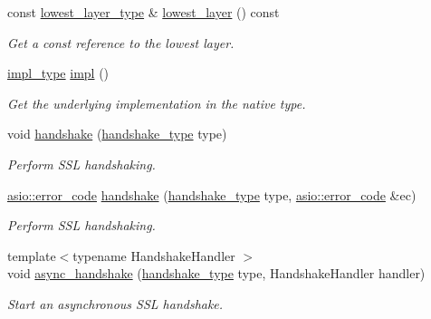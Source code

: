 \begin{DoxyCompactItemize}
const \hyperlink{classasio_1_1ssl_1_1old_1_1stream_a6b664149066b698269db4e2f4e846ca2}{lowest\+\_\+layer\+\_\+type} \& \hyperlink{classasio_1_1ssl_1_1old_1_1stream_ab029c9d927db0140d70c6730226aad03}{lowest\+\_\+layer} () const 
\begin{DoxyCompactList}\small\item\em Get a const reference to the lowest layer. \end{DoxyCompactList}\item 
\hyperlink{classasio_1_1ssl_1_1old_1_1stream_a965fd8deeebbf308d18fbac925009d8d}{impl\+\_\+type} \hyperlink{classasio_1_1ssl_1_1old_1_1stream_ac8d24d7329411233167125d82b6d38bf}{impl} ()
\begin{DoxyCompactList}\small\item\em Get the underlying implementation in the native type. \end{DoxyCompactList}\item 
void \hyperlink{classasio_1_1ssl_1_1old_1_1stream_a326a75224a55b43ac12d2676d465958c}{handshake} (\hyperlink{classasio_1_1ssl_1_1stream__base_a2f18813d3860bc8aee99249834d7c320}{handshake\+\_\+type} type)
\begin{DoxyCompactList}\small\item\em Perform S\+S\+L handshaking. \end{DoxyCompactList}\item 
\hyperlink{classasio_1_1error__code}{asio\+::error\+\_\+code} \hyperlink{classasio_1_1ssl_1_1old_1_1stream_ad4d612fa88c243e25dad7e1db1428973}{handshake} (\hyperlink{classasio_1_1ssl_1_1stream__base_a2f18813d3860bc8aee99249834d7c320}{handshake\+\_\+type} type, \hyperlink{classasio_1_1error__code}{asio\+::error\+\_\+code} \&ec)
\begin{DoxyCompactList}\small\item\em Perform S\+S\+L handshaking. \end{DoxyCompactList}\item 
{\footnotesize template$<$typename Handshake\+Handler $>$ }\\void \hyperlink{classasio_1_1ssl_1_1old_1_1stream_a0d27ecfa0483d789afcf60638db66d76}{async\+\_\+handshake} (\hyperlink{classasio_1_1ssl_1_1stream__base_a2f18813d3860bc8aee99249834d7c320}{handshake\+\_\+type} type, Handshake\+Handler handler)
\begin{DoxyCompactList}\small\item\em Start an asynchronous S\+S\+L handshake. \end{DoxyCompactList}\item 

\end{DoxyCompactItemize}
